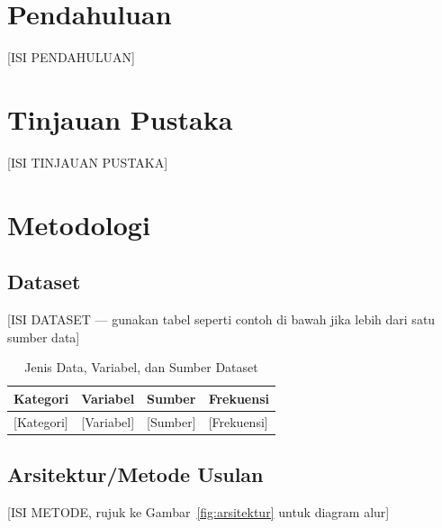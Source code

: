 \documentclass[10pt,a4paper,twocolumn]{article}
\begin{document}
\justifying

\section{Pendahuluan}
[ISI PENDAHULUAN]

\section{Tinjauan Pustaka}
[ISI TINJAUAN PUSTAKA]

\section{Metodologi}

\subsection{Dataset}
[ISI DATASET — gunakan tabel seperti contoh di bawah jika lebih dari satu
sumber data]

\begin{table}[t]
\centering
\caption{Jenis Data, Variabel, dan Sumber Dataset}
\label{tab:dataset}
\footnotesize
\begin{tabular}{@{}p{1.3cm}p{1.8cm}p{1.5cm}p{1.5cm}@{}}
\toprule
\textbf{Kategori} & \textbf{Variabel} & \textbf{Sumber} & \textbf{Frekuensi} \\
\midrule
{[Kategori]} & [Variabel] & [Sumber] & [Frekuensi] \\
\bottomrule
\end{tabular}
\end{table}

\subsection{Arsitektur/Metode Usulan}
[ISI METODE, rujuk ke Gambar~\ref{fig:arsitektur} untuk diagram alur]
\end{document}
